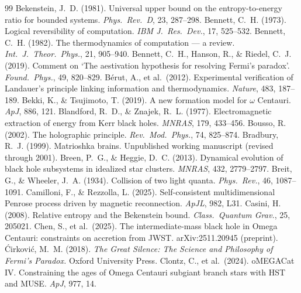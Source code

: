 \documentclass[11pt]{article}
\begin{document}
\begin{thebibliography}{99}
 Bekenstein, J.~D. (1981). Universal upper bound on the entropy-to-energy ratio for bounded systems. \emph{Phys.\ Rev.\ D}, 23, 287--298.
 Bennett, C.~H. (1973). Logical reversibility of computation. \emph{IBM J.\ Res.\ Dev.}, 17, 525--532.
 Bennett, C.~H. (1982). The thermodynamics of computation --- a review. \emph{Int.\ J.\ Theor.\ Phys.}, 21, 905--940.
 Bennett, C.~H., Hanson, R., \& Riedel, C.~J. (2019). Comment on `The aestivation hypothesis for resolving Fermi's paradox'. \emph{Found.\ Phys.}, 49, 820--829.
 B\'erut, A., et al.\ (2012). Experimental verification of Landauer's principle linking information and thermodynamics. \emph{Nature}, 483, 187--189.
 Bekki, K., \& Tsujimoto, T. (2019). A new formation model for $\omega$ Centauri. \emph{ApJ}, 886, 121.
 Blandford, R.~D., \& Znajek, R.~L. (1977). Electromagnetic extraction of energy from Kerr black holes. \emph{MNRAS}, 179, 433--456.
 Bousso, R. (2002). The holographic principle. \emph{Rev.\ Mod.\ Phys.}, 74, 825--874.
 Bradbury, R.~J. (1999). Matrioshka brains. Unpublished working manuscript (revised through 2001).
 Breen, P.~G., \& Heggie, D.~C. (2013). Dynamical evolution of black hole subsystems in idealized star clusters. \emph{MNRAS}, 432, 2779--2797.
 Breit, G., \& Wheeler, J.~A. (1934). Collision of two light quanta. \emph{Phys.\ Rev.}, 46, 1087--1091.
 Camilloni, F., \& Rezzolla, L. (2025). Self-consistent multidimensional Penrose process driven by magnetic reconnection. \emph{ApJL}, 982, L31.
 Casini, H. (2008). Relative entropy and the Bekenstein bound. \emph{Class.\ Quantum Grav.}, 25, 205021.
 Chen, S., et al.\ (2025). The intermediate-mass black hole in Omega Centauri: constraints on accretion from JWST. arXiv:2511.20945 (preprint).
 \'Cirkovi\'c, M.~M. (2018). \emph{The Great Silence: The Science and Philosophy of Fermi's Paradox.} Oxford University Press.
 Clontz, C., et al.\ (2024). oMEGACat IV. Constraining the ages of Omega Centauri subgiant branch stars with HST and MUSE. \emph{ApJ}, 977, 14.

\end{thebibliography}
\end{document}
